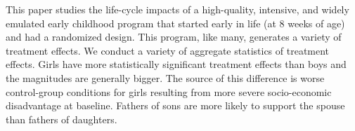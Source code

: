 \noindent This paper studies the life-cycle impacts of a high-quality, intensive, and widely emulated early childhood program that started early in life (at 8 weeks of age) and had a randomized design. This program, like many, generates a variety of treatment effects. We conduct a variety of aggregate statistics of treatment effects. Girls have more statistically significant treatment effects than boys and the magnitudes are generally bigger. The source of this difference is worse control-group conditions for girls resulting from more severe socio-economic disadvantage at baseline. Fathers of sons are more likely to support the spouse than fathers of daughters.
